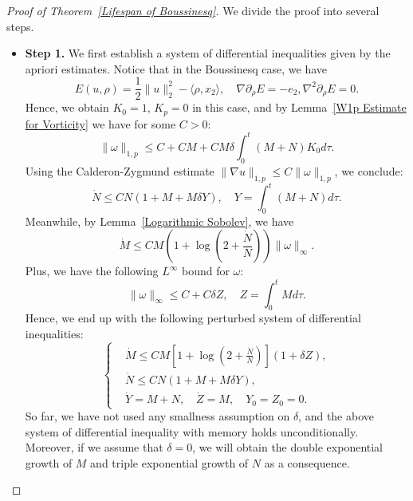\documentclass[12pt,letterpaper]{article}
\theoremstyle{plain}
\begin{document}
\begin{proof}[Proof of Theorem~\ref{Lifespan of Boussinesq}]

We divide the proof into several steps.
\begin{itemize}
    \item \textbf{Step 1.} We first establish a system of differential inequalities given by the apriori estimates. Notice that in the Boussinesq case, we have 
    \begin{equation*}
     E(u,\rho)=\frac{1}{2}\lVert u\rVert_2^2 -\langle \rho,x_2\rangle,\quad \nabla\partial_\rho E=-e_2, \nabla^2\partial_\rho E=0   .
    \end{equation*}
    Hence, we obtain $K_0= 1$, $K_p=0$ in this case, and by Lemma~\ref{W1p Estimate for Vorticity} we have for some $C> 0$:
    \begin{equation*}
  \lVert\omega\rVert_{1,p}\le C+CM+CM\delta\int_0^ t (M+N)K_0 d\tau   .  
    \end{equation*}
    Using the Calderon-Zygmund estimate $\lVert\nabla u\rVert_{1,p}\le C\lVert\omega\rVert_{1,p}$, we conclude:
    \begin{equation*}
    \dot N\le CN (1+M+M\delta Y),\quad Y=\int_0^t (M+N) d\tau  . 
    \end{equation*}
    Meanwhile, by Lemma~\ref{Logarithmic Sobolev}, we have
    \begin{equation*}
     \dot M\le CM(1+\log(2+ \frac{\dot N}{N})) \lVert\omega\rVert_\infty .  
    \end{equation*}
    Plus, we have the following $L^\infty$ bound for $\omega$:
    \begin{equation*}
    \lVert\omega\rVert_\infty\le   C+C\delta Z,\quad Z=\int_0^t Md\tau  .
    \end{equation*}
    Hence, we end up with the following perturbed system of differential inequalities:
    \begin{equation}\label{Boussinesq Differential Inequalities}
\left\{
\begin{aligned}
&\dot M\le CM[1+\log(2+\frac{\dot N}{N})] (1+\delta Z),\\
&\dot N\le CN (1+M+M\delta Y),\\
&  \dot Y=M+N,\quad \dot Z=M,\quad Y_0=Z_0=0.
\end{aligned}
\right.
\end{equation}
So far, we have not used any smallness assumption on $\delta$, and the above system of  differential inequality with memory holds unconditionally. Moreover, if we assume that $\delta=0$, we will obtain the double exponential growth of $M$ and triple exponential growth of $N$ as a consequence. 


\end{itemize}
\end{proof}
\end{document}
